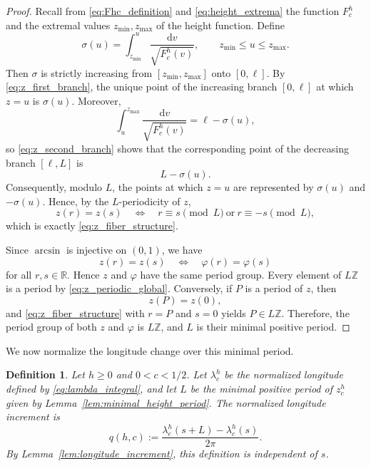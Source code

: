 \documentclass[a4paper,11pt]{amsart}
\numberwithin{equation}{section}
\theoremstyle{plain}
\newtheorem{defn}[thm]{Definition}
\newcommand{\dif}{\mathrm{d}}
\begin{document}
\begin{proof}
Recall from \eqref{eq:Fhc_definition} and
\eqref{eq:height_extrema} the function $F_c^h$ and the extremal values
$z_{\min},z_{\max}$ of the height function. Define
\[
\sigma(u)
=
\int_{z_{\min}}^{u}
\frac{\dif v}{\sqrt{F_c^h(v)}},
\qquad
z_{\min}\le u\le z_{\max}.
\]
Then $\sigma$ is strictly increasing from
$[z_{\min},z_{\max}]$ onto $[0,\ell]$. By
\eqref{eq:z_first_branch}, the unique point of the increasing branch
$[0,\ell]$ at which $z=u$ is $\sigma(u)$. Moreover,
\[
\int_u^{z_{\max}}
\frac{\dif v}{\sqrt{F_c^h(v)}}
=
\ell-\sigma(u),
\]
so \eqref{eq:z_second_branch} shows that the corresponding point of the
decreasing branch $[\ell,L]$ is
\[
L-\sigma(u).
\]
Consequently, modulo $L$, the points at which $z=u$ are represented by
$\sigma(u)$ and $-\sigma(u)$. Hence, by the $L$-periodicity of $z$,
\[
z(r)=z(s)
\quad\Longleftrightarrow\quad
r\equiv s\pmod L
\ \text{or}\
r\equiv -s\pmod L,
\]
which is exactly \eqref{eq:z_fiber_structure}.

Since $\arcsin$ is injective on $(0,1)$, we have
\[
z(r)=z(s)
\quad\Longleftrightarrow\quad
\varphi(r)=\varphi(s)
\]
for all $r,s\in\mathbb R$. Hence $z$ and $\varphi$ have the same period
group. Every element of $L\mathbb Z$ is a period by
\eqref{eq:z_periodic_global}. Conversely, if $P$ is a period of $z$,
then
\[
z(P)=z(0),
\]
and \eqref{eq:z_fiber_structure} with $r=P$ and $s=0$ yields
$P\in L\mathbb Z$. Therefore, the period group of both $z$ and
$\varphi$ is $L\mathbb Z$, and $L$ is their minimal positive period.
\end{proof}

We now normalize the longitude change over this minimal period.

\begin{defn}\label{def:q}
Let $h\geq0$ and $0<c<1/2$. Let $\lambda_c^h$ be the normalized longitude defined by
\eqref{eq:lambda_integral}, and let $L$ be the minimal positive period of
$z_c^h$ given by Lemma~\ref{lem:minimal_height_period}. The
\emph{normalized longitude increment} is
\begin{equation}\label{eq:q_definition}
q(h,c)
:=
\frac{\lambda_c^h(s+L)-\lambda_c^h(s)}{2\pi}.
\end{equation}
By Lemma~\ref{lem:longitude_increment}, this definition is independent
of $s$.
\end{defn}
\end{document}
